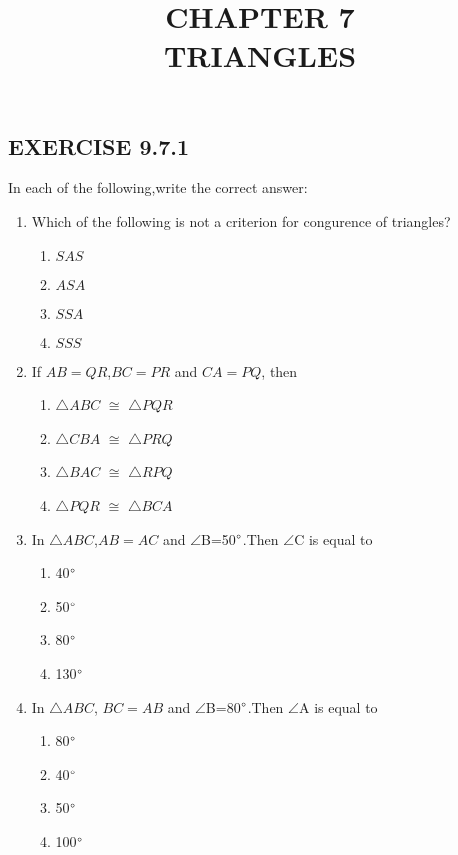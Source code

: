 \documentclass{article}
\begin{document}
\begin{center}
\title{CHAPTER 7\\TRIANGLES}
\date{}
\maketitle
\section{EXERCISE 9.7.1}     
\end{center}

In each of the following,write the correct answer:

\begin{enumerate}
\item Which of the following is not a criterion for congurence of triangles?
\begin{enumerate} 
\item $SAS$
\item $ASA$
\item $SSA$
\item $SSS$
\end{enumerate}
\item If $AB=QR$,$BC=PR$ and $CA=PQ$, then
\begin{enumerate}
\item $\triangle ABC$ $\cong$ $\triangle PQR$
\item $\triangle CBA$ $\cong$ $\triangle PRQ$
\item $\triangle BAC$ $\cong$ $\triangle RPQ$
\item $\triangle PQR$ $\cong$ $\triangle BCA$
\end{enumerate}
\item In $\triangle ABC$,$AB=AC$ and $\angle$B=50$\degree$.Then $\angle$C is equal to
\begin{enumerate}
\item 40$\degree$
\item 50$\degree$
\item 80$\degree$
\item 130$\degree$
\end{enumerate}
\item In $\triangle ABC$, $BC=AB$ and $\angle$B=80$\degree$.Then $\angle$A is equal to
\begin{enumerate}
\item 80$\degree$
\item 40$\degree$
\item 50$\degree$
\item 100$\degree$

\end{enumerate}
\end{enumerate}
\end{document}
